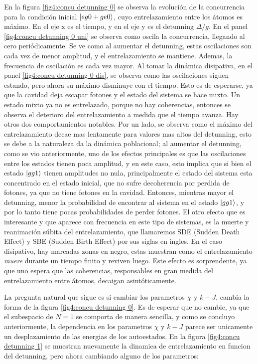 En la figura \ref{fig4:concu detunning 0} se observa la evolución de la concurrencia para la condición inicial $\ket{eg0+ge0}$, cuyo entrelazamiento entre los átomos es máximo. En el eje x es el tiempo, y en el eje y es el detunning $\Delta/g$. En el panel \ref{fig4:concu detunning 0 uni} se observa como oscila la concurrencia, llegando al cero periódicamente. Se ve como al aumentar el detunning, estas oscilaciones son cada vez de menor amplitud, y el entrelazamiento se mantiene. Ademas, la frecuencia de oscilación es cada vez mayor. Al tomar la dinámica disipativa, en el panel \ref{fig4:concu detunning 0 dis}, se observa como las oscilaciones siguen estando, pero ahora su máximo disminuye con el tiempo. Esto es de esperarse, ya que la cavidad deja escapar fotones y el estado del sistema se hace mixto. Un estado mixto ya no es entrelazado, porque no hay coherencias, entonces se observa el deterioro del entrelazamiento a medida que el tiempo avanza. Hay otros dos comportamientos notables. Por un lado, se observa como el máximo del entrelazamiento decae mas lentamente para valores mas altos del detunning, esto se debe a la naturaleza da la dinámica poblacional; al aumentar el detunning, como se vio anteriormente, uno de los efectos principales es que las oscilaciones entre los estados tienen poca amplitud, y en este caso, esto implica que si bien el estado $\ket{gg1}$ tienen amplitudes no nula, principalmente el estado del sistema esta concentrado en el estado inicial, que no sufre decoherencia por perdida de fotones, ya que no tiene fotones en la cavidad. Entonces, mientras mayor el detunning, menor la probabilidad de encontrar al sistema en el estado $\ket{gg1}$, y por lo tanto tiene pocas probabilidades de perder fotones. El otro efecto que es interesante y que aparece con frecuencia en este tipo de sistemas, es la muerte y reanimación súbita del entrelazamiento, que llamaremos SDE (Sudden Death Effect) y SBE (Sudden Birth Effect) por sus siglas en ingles. En el caso disipativo, hay marcadas zonas en negro, estas muestran como el entrelazamiento \textit{muere} durante un tiempo finito y reviven luego. Este efecto es sorprendente, ya que uno espera que las coherencias, responsables en gran medida del entrelazamiento entre átomos, decaigan asintóticamente. 

La pregunta natural que sigue es si cambiar los parametros $\chi$ y $k-J$, cambia la forma de la figura \ref{fig4:concu detunning 0}. Es de esperar que no cambie, ya que el subespacio de $N=1$ se comporta de manera sencilla, y como se concluyo anteriormente, la dependencia en los parametros $\chi$ y $k-J$ parece ser unicamente un desplazamiento de las energias de los autoestados. En la figura \ref{fig4:concu detunning 1} se muestran nuevamente la dinamica de entrelazamiento en funcion del detunning, pero ahora cambiando alguno de los parametros:

